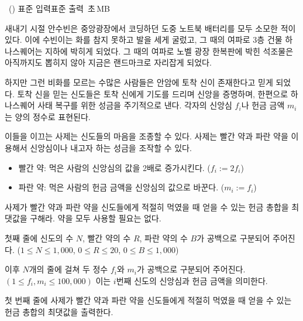 \begin{problem}{\kcpcprobfaith\ (\kcpcprobfaithshort)}
    {표준 입력}{표준 출력}
    {\kcpcprobfaithtime\,초}{\kcpcprobfaithmemory\,MB}{}
    
    새내기 시절 안수빈은 중앙광장에서 코딩하던 도중 노트북 배터리를 모두 소모한 적이 있다. 이에 수빈이는 화를 참지 못하고 발을 세게 굴렀고, 그 때의 여파로 3층 건물 하나스퀘어는 지하에 박히게 되었다. 그 때의 여파로 노벨 광장 한복판에 박힌 석조물은 아직까지도 뽑히지 않아 지금은 랜드마크로 자리잡게 되었다.
    
    하지만 그런 비화를 모르는 수많은 사람들은 안암에 토착 신이 존재한다고 믿게 되었다. 토착 신을 믿는 신도들은 토착 신에게 기도를 드리며 신앙을 증명하며, 한편으로 하나스퀘어 사태 복구를 위한 성금을 주기적으로 낸다. 각자의 신앙심 $f_i$나 헌금 금액 $m_i$는 양의 정수로 표현된다.
    
    이들을 이끄는 사제는 신도들의 마음을 조종할 수 있다. 사제는 빨간 약과 파란 약을 이용해서 신앙심이나 내고자 하는 성금을 조작할 수 있다.
    
    \begin{itemize}
    \item 빨간 약: 먹은 사람의 신앙심의 값을 2배로 증가시킨다. ($f_i := 2 f_i$)
    \item 파란 약: 먹은 사람의 헌금 금액을 신앙심의 값으로 바꾼다. ($m_i := f_i$)
    \end{itemize}
    
    사제가 빨간 약과 파란 약을 신도들에게 적절히 먹였을 때 얻을 수 있는 헌금 총합을 최댓값을 구해라. 약을 모두 사용할 필요는 없다. 
    
    
    \InputFile
    첫째 줄에 신도의 수 $N$, 빨간 약의 수 $R$, 파란 약의 수 $B$가 공백으로 구분되어 주어진다. ($1 \le N \le 1,000$, $0 \le R\le 20$, $0 \le B \le 1,000$)
    
    이후 $N$개의 줄에 걸쳐 두 정수 $f_i$와 $m_i$가 공백으로 구분되어 주어진다. $(1 \leq f_i, m_i \leq 100,000)$ 이는 $i$번째 신도의 신앙심과 헌금 금액을 의미한다.
    
    \OutputFile
    첫 번째 줄에 사제가 빨간 약과 파란 약을 신도들에게 적절히 먹였을 때 얻을 수 있는 헌금 총합의 최댓값을 출력한다.
    
    \Examples
    \begin{example}
    \end{example}
\end{problem}

